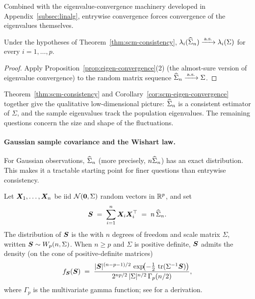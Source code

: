 Combined with the eigenvalue-convergence machinery developed in Appendix~\ref{subsec:linalg}, entrywise convergence forces convergence of the eigenvalues themselves.

\begin{corollary}\label{cor:scm-eigen-convergence}
Under the hypotheses of Theorem~\ref{thm:scm-consistency}, \(\lambda_i(\widehat{\Sigma}_n) \xrightarrow{\,\text{a.s.}\,} \lambda_i(\Sigma)\) for every \(i = 1, \ldots, p\).
\end{corollary}

\begin{proof}
Apply Proposition~\ref{prop:eigen-convergence}(2) (the almost-sure version of eigenvalue convergence) to the random matrix sequence \(\widehat{\Sigma}_n \xrightarrow{\,\text{a.s.}\,} \Sigma\).
\end{proof}

Theorem~\ref{thm:scm-consistency} and Corollary~\ref{cor:scm-eigen-convergence} together give the qualitative low-dimensional picture: \(\widehat{\Sigma}_n\) is a consistent estimator of \(\Sigma\), and the sample eigenvalues track the population eigenvalues. The remaining questions concern the size and shape of the fluctuations.

\paragraph{Gaussian sample covariance and the Wishart law.} For Gaussian observations, \(\widehat{\Sigma}_n\) (more precisely, \(n \widehat{\Sigma}_n\)) has an exact distribution. This makes it a tractable starting point for finer questions than entrywise consistency.

\begin{definition}\label{def:wishart}
Let \(\bm{X}_1, \ldots, \bm{X}_n\) be iid \(\mathcal{N}(\bm{0}, \Sigma)\) random vectors in \(\mathbb{R}^p\), and set
\[
  \bm{S} \;=\; \sum_{i = 1}^n \bm{X}_i \bm{X}_i^{\top} \;=\; n\, \widehat{\Sigma}_n.
\]
The distribution of \(\bm{S}\) is the  with \(n\) degrees of freedom and scale matrix \(\Sigma\), written \(\bm{S} \sim W_{p}(n, \Sigma)\). When \(n \ge p\) and \(\Sigma\) is positive definite, \(\bm{S}\) admits the density (on the cone of positive-definite matrices)
\begin{equation}
  f_{\bm{S}}(\bm{S}) \;=\; \frac{\lvert\bm{S}\rvert^{(n - p - 1)/2}\, \exp\!\bigl(-\tfrac{1}{2}\, \operatorname{tr}(\Sigma^{-1} \bm{S})\bigr)}{2^{n p / 2}\, \lvert\Sigma\rvert^{n/2}\, \Gamma_p(n / 2)},
  \label{eq:wishart-density}
\end{equation}
where \(\Gamma_p\) is the multivariate gamma function; see \citet[][\S~3.2]{Muirhead1982} for a derivation.
\end{definition}


